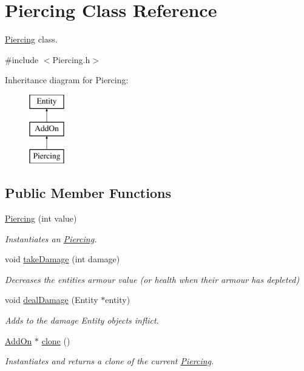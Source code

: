 \hypertarget{classPiercing}{}\section{Piercing Class Reference}
\label{classPiercing}


\hyperlink{classPiercing}{Piercing} class.  




{\ttfamily \#include $<$Piercing.\+h$>$}

Inheritance diagram for Piercing\+:\begin{figure}[H]
\begin{center}
\leavevmode
\includegraphics[height=3.000000cm]{classPiercing}
\end{center}
\end{figure}
\subsection*{Public Member Functions}
\begin{DoxyCompactItemize}
\item 
\hyperlink{classPiercing_ad97c2ba97b49b1de3ac2d2c2253453fe}{Piercing} (int value)
\begin{DoxyCompactList}\small\item\em Instantiates an \hyperlink{classPiercing}{Piercing}. \end{DoxyCompactList}\item 
void \hyperlink{classPiercing_a103634469a43e1662bd5e07e66901667}{take\+Damage} (int damage)
\begin{DoxyCompactList}\small\item\em Decreases the entities\textquotesingle{} armour value (or health when their armour has depleted) \end{DoxyCompactList}\item 
void \hyperlink{classPiercing_a2dbd4a497f9abbebbbd2ceb2909f6163}{deal\+Damage} (Entity $\ast$entity)
\begin{DoxyCompactList}\small\item\em Adds to the damage Entity objects inflict. \end{DoxyCompactList}\item 
\hyperlink{classAddOn}{Add\+On} $\ast$ \hyperlink{classPiercing_aeb41b04515f5aad4d9f153b0de332849}{clone} ()
\begin{DoxyCompactList}\small\item\em Instantiates and returns a clone of the current \hyperlink{classPiercing}{Piercing}. \end{DoxyCompactList}\end{DoxyCompactItemize}
